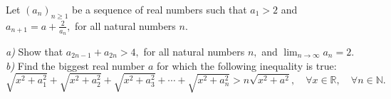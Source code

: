 Let $ \left( a_n \right)_{n\ge 1} $ be a sequence of real numbers such that $ a_1>2 $ and $ a_{n+1} =a+\frac{2}{a_n} , $ for all natural numbers $ n. $

\textit{a)} Show that $ a_{2n-1} +a_{2n} >4 , $ for all natural numbers $ n, $ and $ \lim_{n\to\infty} a_n =2. $
\textit{b)} Find the biggest real number $ a $ for which the following inequality is true:
$$ \sqrt{x^2+a_1^2} +\sqrt{x^2+a_2^2} +\sqrt{x^2+a_3^2} +\cdots +\sqrt{x^2+a_n^2} > n\sqrt{x^2+a^2}, \quad\forall x\in\mathbb{R} ,\quad\forall n\in\mathbb{N} . $$